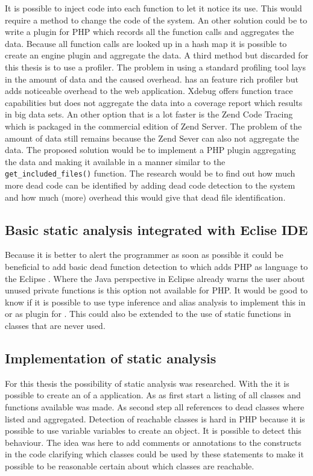 It is possible to inject code into each function to let it notice its use. This would require a method to change the code of the system. An other solution could be to write a plugin for PHP which records all the function calls and aggregates the data. Because all function calls are looked up in a hash map\cite{biggar2009draft} it is possible to create an engine plugin and aggregate the data. A third method but discarded for this thesis is to use a profiler. The problem in using a standard profiling tool lays in the amount of data and the caused overhead.  has an feature rich profiler but adds noticeable overhead to the web application. Xdebug offers function trace capabilities but does not aggregate the data into a coverage report which results in big data sets. An other option that is a lot faster is the Zend Code Tracing which is packaged in the commercial edition of Zend Server. The problem of the amount of data still remains because the Zend Sever can also not aggregate the data. The proposed solution would be to implement a PHP plugin aggregating the data and making it available in a manner similar to the \verb|get_included_files()| function. The research would be to find out how much more dead code can be identified by adding dead code detection to the system and how much (more) overhead this would give that dead file identification.

\subsection*{Basic static analysis integrated with Eclise IDE}
Because it is better to alert the programmer as soon as possible it could be beneficial to add basic dead function detection to \pdt which adds PHP as language to the Eclipse \ide. Where the Java perspective in Eclipse already warns the user about unused private functions is this option not available for PHP. It would be good to know if it is possible to use type inference and alias analysis\cite{biggar2009draft,biggar2010} to implement this in or as plugin for \pdt. This could also be extended to the use of static functions in classes that are never used.

\subsection*{Implementation of static analysis}
For this thesis the possibility of static analysis was researched. With the \phc\cite{biggar2010} it is possible to create an \gast of a application. As as first start a listing of all classes and functions available was made. As second step all references to dead classes where listed and aggregated. Detection of reachable classes is hard in PHP because it is possible to use variable variables to create an object. It is possible to detect this behaviour. The idea was here to add comments or annotations to the constructs in the code clarifying which classes could be used by these statements to make it possible to be reasonable certain about which classes are reachable.

